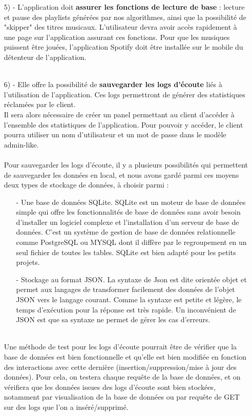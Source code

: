 \documentclass[12pt, openany]{report}
\begin{document}
\begin{itemize}
\item[5) -] L'application doit \textbf{assurer les fonctions de lecture de base} : lecture et pause des playlists générées par nos algorithmes, ainsi que la possibilité de "skipper" des titres musicaux. L'utilisateur devra avoir accès rapidement à une page sur l'application assurant ces fonctions. Pour que les musiques puissent être jouées, l'application Spotify doit être installée sur le mobile du détenteur de l'application.
\\
\\
\item[6) -] Elle offre la possibilité de \textbf{sauvegarder les logs d'écoute} liés à l'utilisation de l'application. Ces logs permettront de générer des statistiques réclamées par le client. 
\\
Il sera alors nécessaire de créer un panel permettant au client d'accéder à l'ensemble des statistiques de l'application. Pour pouvoir y accéder, le client pourra utiliser un nom d'utilisateur et un mot de passe dans le modèle admin-like.
\\
\\
Pour sauvegarder les logs d'écoute, il y a plusieurs possibilités qui permettent de sauvegarder les données en local, et nous avons gardé parmi ces moyens deux types de stockage de données, à choisir parmi :
\begin{itemize}
\item[-] Une base de données SQLite.
    SQLite est un moteur de base de données simple qui offre les fonctionnalités de base de données sans avoir besoin d'installer un logiciel complexe et l'installation d'un serveur de base de données. C'est un système de gestion de base de données relationnelle comme PostgreSQL ou MYSQL dont il diffère par le regroupement en un seul fichier de toutes les tables. SQLite est bien adapté pour les petits projets.
\item[-] Stockage au format JSON.
    La syntaxe de Json est dite orientée objet et permet aux langages de transformer facilement des données de l'objet JSON vers le langage courant. Comme la syntaxe est petite et légère, le temps d'exécution pour la réponse est très rapide. Un inconvénient de JSON est que sa syntaxe ne permet de gérer les cas d'erreurs.
\\
\\
\end{itemize}

Une méthode de test pour les logs d'écoute pourrait être de vérifier que la base de données est bien fonctionnelle et qu'elle est bien modifiée en fonction des interactions avec cette dernière (insertion/suppression/mise à jour des données). Pour cela, on testera chaque requête de la base de données, et on vérifiera que les données issues des logs d'écoute sont bien stockées, notamment par visualisation de la base de données ou par requête de GET sur des logs que l'on a inséré/supprimé.

\end{itemize}
\end{document}

